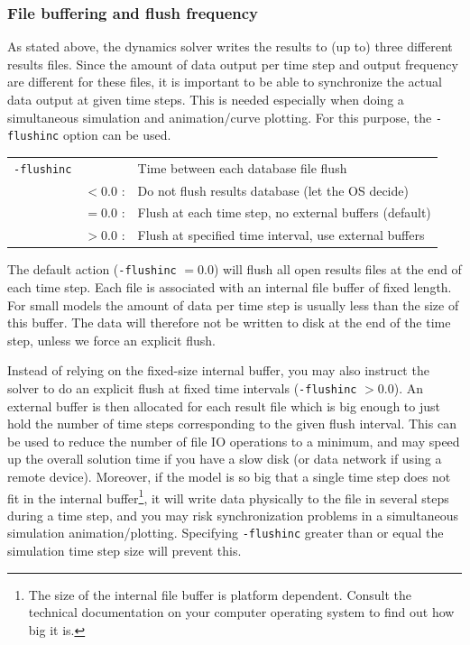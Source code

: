 {\subsubsection{File buffering and flush frequency}

As stated above, the dynamics solver writes the results to (up to) three
different results files. Since the amount of data output per time step and
output frequency are different for these files, it is important to be able to
synchronize the actual data output at given time steps. This is needed
especially when doing a simultaneous simulation and animation/curve plotting.
For this purpose, the {\tt-flushinc} option can be used.

\begin{tabular}{ m{14mm} m{10mm} m{85mm} }
{\tt-flushinc} & & Time between each database file flush \\
& $<0.0$ :     & Do not flush results database (let the OS decide) \\
& $=0.0$ :     & Flush at each time step, no external buffers (default) \\
& $>0.0$ :     & Flush at specified time interval, use external buffers
\end{tabular}

The default action ({\tt-flushinc} $=0.0$) will flush all open results files at
the end of each time step. Each file is associated with an internal file buffer
of fixed length. For small models the amount of data per time step is usually
less than the size of this buffer. The data will therefore not be written to
disk at the end of the time step, unless we force an explicit flush.

Instead of relying on the fixed-size internal buffer, you may also instruct the
solver to do an explicit flush at fixed time intervals ({\tt-flushinc} $>0.0$).
An external buffer is then allocated for each result file which is big enough to
just hold the number of time steps corresponding to the given flush interval.
This can be used to reduce the number of file IO operations to a minimum,
and may speed up the overall solution time if you have a slow disk
(or data network if using a remote device).
Moreover, if the model is so big that a single time step does not fit in the
internal buffer\footnote{
The size of the internal file buffer is platform dependent.
Consult the technical documentation on your computer operating system to find
out how big it is.}, it will write data physically to the file in several steps
during a time step, and you may risk synchronization problems in a simultaneous
simulation animation/plotting. Specifying {\tt-flushinc} greater than or equal
the simulation time step size will prevent this.

}
